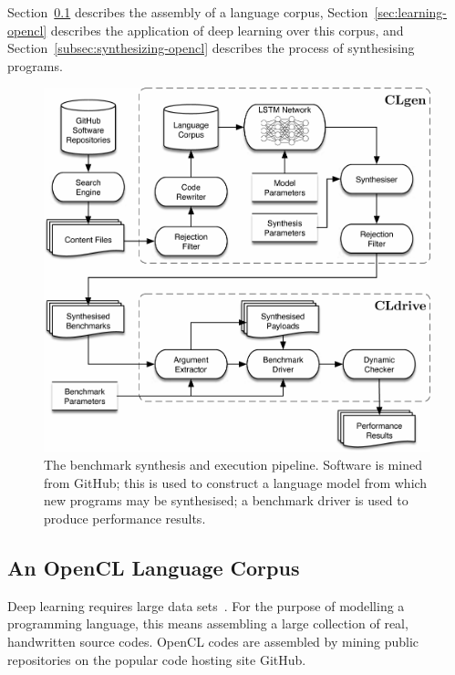 Section~\ref{subsec:opencl-lang-corpus} describes the assembly of a language corpus, Section~\ref{sec:learning-opencl} describes the application of deep learning over this corpus, and Section~\ref{subsec:synthesizing-opencl} describes the process of synthesising programs.

\begin{figure}
  \centering%
  \includegraphics[width=\columnwidth]{img/clgen-pipeline}%
  \caption[Benchmark synthesis and execution pipeline]{%
    The benchmark synthesis and execution pipeline. Software is mined from GitHub; this is used to construct a language model from which new programs may be synthesised; a benchmark driver is used to produce performance results.%
  }%
  \label{fig:clgen-pipeline}
\end{figure}


\subsection{An OpenCL Language Corpus}
\label{subsec:opencl-lang-corpus}

Deep learning requires large data sets~\cite{LeCun2015}. For the purpose of modelling a programming language, this means assembling a large collection of real, handwritten source codes. OpenCL codes are assembled by mining public repositories on the popular code hosting site GitHub.

